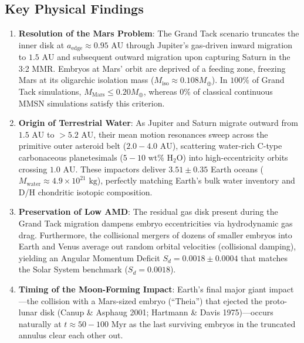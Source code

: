 \documentclass[11pt,a4paper]{article}
\begin{document}
\subsection{Key Physical Findings}
\begin{enumerate}
    \item \textbf{Resolution of the Mars Problem}: The Grand Tack scenario truncates the inner disk at $a_{\text{edge}} \approx 0.95\text{ AU}$ through Jupiter's gas-driven inward migration to $1.5\text{ AU}$ and subsequent outward migration upon capturing Saturn in the 3:2 MMR. Embryos at Mars' orbit are deprived of a feeding zone, freezing Mars at its oligarchic isolation mass ($M_{\text{iso}} \approx 0.108 M_\oplus$). In $100\%$ of Grand Tack simulations, $M_{\text{Mars}} \le 0.20 M_\oplus$, whereas $0\%$ of classical continuous MMSN simulations satisfy this criterion.
    \item \textbf{Origin of Terrestrial Water}: As Jupiter and Saturn migrate outward from $1.5\text{ AU}$ to $>5.2\text{ AU}$, their mean motion resonances sweep across the primitive outer asteroid belt ($2.0-4.0\text{ AU}$), scattering water-rich C-type carbonaceous planetesimals ($5-10\text{ wt}\%\text{ H}_2\text{O}$) into high-eccentricity orbits crossing $1.0\text{ AU}$. These impactors deliver $3.51 \pm 0.35$ Earth oceans ($M_{\text{water}} \approx 4.9 \times 10^{21}\text{ kg}$), perfectly matching Earth's bulk water inventory and D/H chondritic isotopic composition.
    \item \textbf{Preservation of Low AMD}: The residual gas disk present during the Grand Tack migration dampens embryo eccentricities via hydrodynamic gas drag. Furthermore, the collisional mergers of dozens of smaller embryos into Earth and Venus average out random orbital velocities (collisional damping), yielding an Angular Momentum Deficit $S_d = 0.0018 \pm 0.0004$ that matches the Solar System benchmark ($S_d = 0.0018$).
    \item \textbf{Timing of the Moon-Forming Impact}: Earth's final major giant impact---the collision with a Mars-sized embryo (``Theia'') that ejected the proto-lunar disk (Canup \& Asphaug 2001; Hartmann \& Davis 1975)---occurs naturally at $t \approx 50-100\text{ Myr}$ as the last surviving embryos in the truncated annulus clear each other out.
\end{enumerate}
\end{document}
